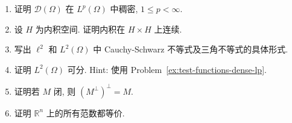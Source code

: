 \begin{enumerate}[label=\thesection.\arabic*.,ref=\thesection.\arabic*,start=1,series=book-problems]
\item\label{ex:test-functions-dense-lp} 证明 $\mathcal{D}(\Omega)$ 在 $L^p(\Omega)$ 中稠密, $1\leq p<\infty$.

\item\label{ex:inner-product-joint-continuity} 设 $H$ 为内积空间. 证明内积在 $H\times H$ 上连续.

\item\label{ex:sequence-lp-two-cauchy-schwarz-triangle} 写出 $\ell^2$ 和 $L^2(\Omega)$ 中 Cauchy-Schwarz 不等式及三角不等式的具体形式.

\item\label{ex:lp-two-separable} 证明 $L^2(\Omega)$ 可分. Hint: 使用 Problem~\ref{ex:test-functions-dense-lp}.

\item\label{ex:closed-subspace-double-orthogonal-complement} 证明若 $M$ 闭, 则 $(M^\perp)^\perp=M$.

\item\label{ex:finite-dimensional-norms-equivalence} 证明 $\mathbb{R}^n$ 上的所有范数都等价.

\end{enumerate}
